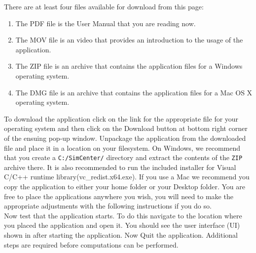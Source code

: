 

There are at least four files available for download from this page: 
\begin{enumerate}
    \item The PDF file is the User Manual that you are reading now.
    \item The MOV file is an video that provides an introduction to the usage of the application.
    \item The ZIP file is an archive that contains the application files for a Windows operating system.
    \item The DMG file is an archive that contains the application files for a Mac OS X operating system.
\end{enumerate}

To download the \texttt{\getsoftwarename{}} application click on the link for
the appropriate file for your operating system and then click on the
Download button at bottom right corner of the ensuing pop-up window. 
Unpackage the application from the downloaded
file and place it in a location on your filesystem. On Windows, we
recommend that you create a \texttt{C:/SimCenter/\getsoftwarename{}}
directory and extract the contents of the \texttt{ZIP} archive
there. It is also recommended to run the included installer for Visual C/C++ runtime library(vc\_redist.x64.exe). 
If you use a Mac we recommend you copy the application to either your
home folder or your Desktop folder. You are free to place the
applications anywhere you wish, you will need to make the
appropriate adjustments with the following instructions if you do so. \\

Now test that the application starts. To do this navigate to
the location where you placed the application and open it. You should
see the user interface (UI) shown in  after
starting the application. Now Quit the application. Additional steps are required before 
computations can be performed.\\

